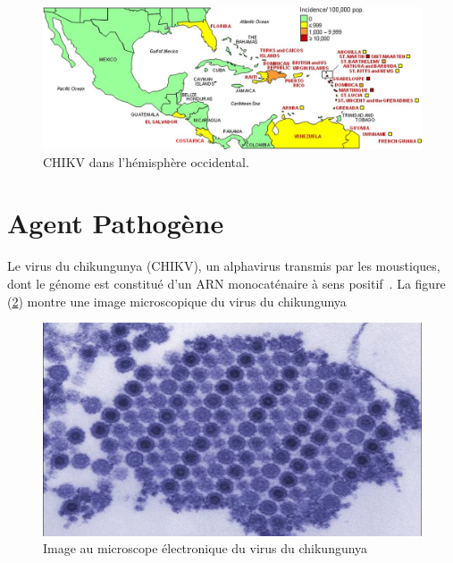 \begin{figure}[!h]
	\begin{center}
		\includegraphics[width=14cm]{images/zjv9990995820001}
	\end{center}
	\caption{CHIKV dans l'hémisphère occidental\cite{Peyrefitte2007}.}
	\label{fig:chikvwestern}
\end{figure}

\section{Agent Pathogène}
Le virus du chikungunya (CHIKV), un alphavirus transmis par les moustiques, dont le génome est constitué d'un ARN monocaténaire à sens positif~\cite{JournalofVirology}. La figure (\ref{fig:chikv}) montre une image microscopique du virus du chikungunya
\begin{figure}[!h]
	\begin{center}
		\includegraphics[width=12cm]{images/CHIK_17550_TEM}
	\end{center}
	\caption{Image au microscope électronique du virus du chikungunya~\cite{chikvcdc}}
	\label{fig:chikv} 
\end{figure}

